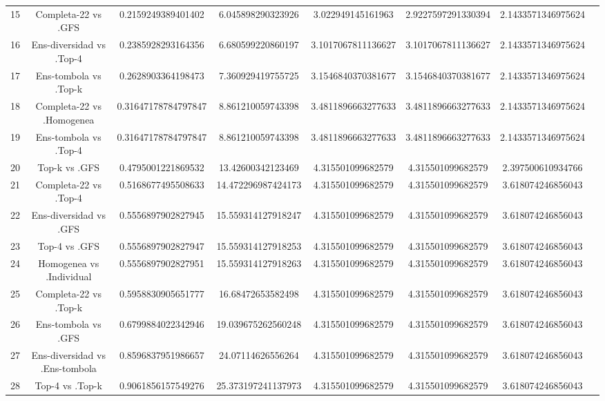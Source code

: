 \documentclass[a4paper,10pt]{article}
\begin{document}
\begin{landscape}
\begin{table}[!htp]
\begin{tabular}{cccccccc}
15&Completa-22 vs .GFS&0.2159249389401402&6.045898290323926&3.022949145161963&2.9227597291330394&2.1433571346975624\\
16&Ens-diversidad vs .Top-4&0.2385928293164356&6.680599220860197&3.1017067811136627&3.1017067811136627&2.1433571346975624\\
17&Ens-tombola vs .Top-k&0.2628903364198473&7.360929419755725&3.1546840370381677&3.1546840370381677&2.1433571346975624\\
18&Completa-22 vs .Homogenea&0.31647178784797847&8.861210059743398&3.4811896663277633&3.4811896663277633&2.1433571346975624\\
19&Ens-tombola vs .Top-4&0.31647178784797847&8.861210059743398&3.4811896663277633&3.4811896663277633&2.1433571346975624\\
20&Top-k vs .GFS&0.4795001221869532&13.42600342123469&4.315501099682579&4.315501099682579&2.397500610934766\\
21&Completa-22 vs .Top-4&0.5168677495508633&14.472296987424173&4.315501099682579&4.315501099682579&3.618074246856043\\
22&Ens-diversidad vs .GFS&0.5556897902827945&15.559314127918247&4.315501099682579&4.315501099682579&3.618074246856043\\
23&Top-4 vs .GFS&0.5556897902827947&15.559314127918253&4.315501099682579&4.315501099682579&3.618074246856043\\
24&Homogenea vs .Individual&0.5556897902827951&15.559314127918263&4.315501099682579&4.315501099682579&3.618074246856043\\
25&Completa-22 vs .Top-k&0.5958830905651777&16.68472653582498&4.315501099682579&4.315501099682579&3.618074246856043\\
26&Ens-tombola vs .GFS&0.6799884022342946&19.039675262560248&4.315501099682579&4.315501099682579&3.618074246856043\\
27&Ens-diversidad vs .Ens-tombola&0.8596837951986657&24.07114626556264&4.315501099682579&4.315501099682579&3.618074246856043\\
28&Top-4 vs .Top-k&0.9061856157549276&25.373197241137973&4.315501099682579&4.315501099682579&3.618074246856043\\
\hline
\end{tabular}
\end{table}

\end{landscape}
\end{document}
